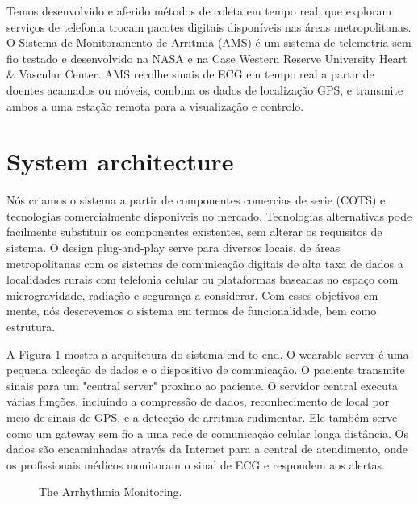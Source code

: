 \documentclass[12pt]{article} %
\begin{document}
Temos desenvolvido e aferido métodos de coleta em tempo real, que exploram serviços de telefonia trocam pacotes digitais disponíveis nas áreas metropolitanas. O Sistema de Monitoramento de Arritmia (AMS) é um sistema de telemetria sem fio testado e desenvolvido na NASA e na Case Western Reserve University Heart & Vascular Center. AMS recolhe sinais de ECG em tempo real a partir de doentes acamados ou móveis, combina os dados de localização GPS, e transmite ambos a uma estação remota para a visualização e controlo.


\section{System architecture} %

Nós criamos o sistema a partir de componentes comercias de serie (COTS) e tecnologias comercialmente disponiveis no mercado. Tecnologias alternativas pode facilmente substituir os componentes existentes, sem alterar os requisitos de sistema. O design plug-and-play serve para diversos locais, de áreas metropolitanas com os sistemas de comunicação digitais de alta taxa de dados a localidades rurais com telefonia celular ou plataformas baseadas no espaço com microgravidade, radiação e segurança a considerar. Com esses objetivos em mente, nós descrevemos o sistema em termos de funcionalidade, bem como estrutura.

A Figura 1 mostra a arquitetura do sistema end-to-end. O wearable server é uma pequena colecção de dados e o dispositivo de comunicação. O paciente transmite sinais para um "central server" proximo ao paciente. O servidor central executa várias funções, incluindo a compressão de dados, reconhecimento de local por meio de sinais de GPS, e a detecção de arritmia rudimentar. Ele também serve como um gateway sem fio a uma rede de comunicação celular longa distância. Os dados são encaminhadas através da Internet para a central de atendimento, onde os profissionais médicos monitoram o sinal de ECG e respondem aos alertas.

\begin{figure}[H] %
\caption{The Arrhythmia Monitoring.}
\label{fig:speciation}
\end{figure}
\end{document}

